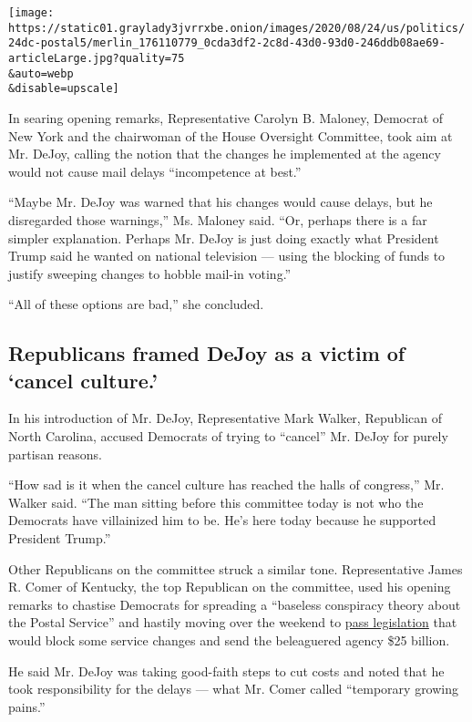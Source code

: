 \texttt{[image: https://static01.graylady3jvrrxbe.onion/images/2020/08/24/us/politics/24dc-postal5/merlin\_176110779\_0cda3df2-2c8d-43d0-93d0-246ddb08ae69-articleLarge.jpg?quality=75\\\&auto=webp\\\&disable=upscale]}

In searing opening remarks, Representative Carolyn B. Maloney, Democrat
of New York and the chairwoman of the House Oversight Committee, took
aim at Mr. DeJoy, calling the notion that the changes he implemented at
the agency would not cause mail delays ``incompetence at best.''

``Maybe Mr. DeJoy was warned that his changes would cause delays, but he
disregarded those warnings,'' Ms. Maloney said. ``Or, perhaps there is a
far simpler explanation. Perhaps Mr. DeJoy is just doing exactly what
President Trump said he wanted on national television --- using the
blocking of funds to justify sweeping changes to hobble mail-in
voting.''

``All of these options are bad,'' she concluded.

\hypertarget{republicans-framed-dejoy-as-a-victim-of-cancel-culture}{%
\subsection{Republicans framed DeJoy as a victim of `cancel
culture.'}\label{republicans-framed-dejoy-as-a-victim-of-cancel-culture}}

In his introduction of Mr. DeJoy, Representative Mark Walker, Republican
of North Carolina, accused Democrats of trying to ``cancel'' Mr. DeJoy
for purely partisan reasons.

``How sad is it when the cancel culture has reached the halls of
congress,'' Mr. Walker said. ``The man sitting before this committee
today is not who the Democrats have villainized him to be. He's here
today because he supported President Trump.''

Other Republicans on the committee struck a similar tone. Representative
James R. Comer of Kentucky, the top Republican on the committee, used
his opening remarks to chastise Democrats for spreading a ``baseless
conspiracy theory about the Postal Service'' and hastily moving over the
weekend to
\href{https://www.nytimes3xbfgragh.onion/2020/08/22/us/politics/usps-bill-congress-vote.html}{pass
legislation} that would block some service changes and send the
beleaguered agency \$25 billion.

He said Mr. DeJoy was taking good-faith steps to cut costs and noted
that he took responsibility for the delays --- what Mr. Comer called
``temporary growing pains.''

